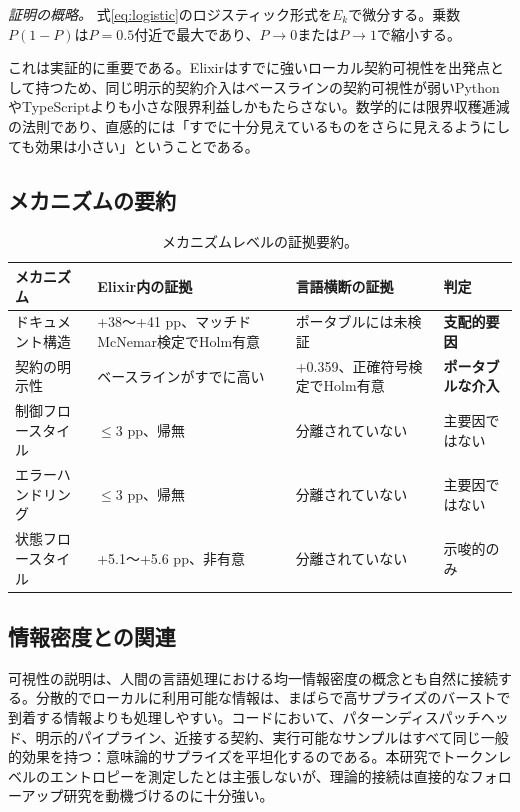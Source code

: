 \documentclass[11pt]{article}
\newcommand{\pp}{pp}
\newcommand{\elixir}{Elixir}
\newcommand{\pythonlang}{Python}
\newcommand{\tslang}{TypeScript}
\begin{document}
\textit{証明の概略。} 式\eqref{eq:logistic}のロジスティック形式を$E_k$で微分する。乗数$P(1-P)$は$P=0.5$付近で最大であり、$P \to 0$または$P \to 1$で縮小する。

これは実証的に重要である。\elixir{}はすでに強いローカル契約可視性を出発点として持つため、同じ明示的契約介入はベースラインの契約可視性が弱い\pythonlang{}や\tslang{}よりも小さな限界利益しかもたらさない。数学的には限界収穫逓減の法則であり、直感的には「すでに十分見えているものをさらに見えるようにしても効果は小さい」ということである。

\subsection{メカニズムの要約}

\begin{table}[H]
\centering
\caption{メカニズムレベルの証拠要約。}
\label{tab:mechanisms}
\small
\begin{tabularx}{\textwidth}{>{\raggedright\arraybackslash}p{}
                >{\raggedright\arraybackslash}X
                >{\raggedright\arraybackslash}X
                >{\raggedright\arraybackslash}p{}}
\toprule
メカニズム & Elixir内の証拠 & 言語横断の証拠 & 判定 \\
\midrule
ドキュメント構造 & +38〜+41 \pp{}、マッチドMcNemar検定でHolm有意 & ポータブルには未検証 & \textbf{支配的要因} \\
契約の明示性 & ベースラインがすでに高い & +0.359、正確符号検定でHolm有意 & \textbf{ポータブルな介入} \\
制御フロースタイル & $\leq 3$ \pp{}、帰無 & 分離されていない & 主要因ではない \\
エラーハンドリング & $\leq 3$ \pp{}、帰無 & 分離されていない & 主要因ではない \\
状態フロースタイル & +5.1〜+5.6 \pp{}、非有意 & 分離されていない & 示唆的のみ \\
\bottomrule
\end{tabularx}
\end{table}

\subsection{情報密度との関連}

可視性の説明は、人間の言語処理における均一情報密度の概念とも自然に接続する\cite{jaeger2010}。分散的でローカルに利用可能な情報は、まばらで高サプライズのバーストで到着する情報よりも処理しやすい。コードにおいて、パターンディスパッチヘッド、明示的パイプライン、近接する契約、実行可能なサンプルはすべて同じ一般的効果を持つ：意味論的サプライズを平坦化するのである。本研究でトークンレベルのエントロピーを測定したとは主張しないが、理論的接続は直接的なフォローアップ研究を動機づけるのに十分強い。
\end{document}
